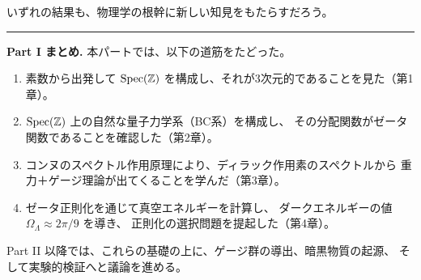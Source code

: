 いずれの結果も、物理学の根幹に新しい知見をもたらすだろう。

\vspace{2em}
\begin{center}
  \rule{0.4\textwidth}{0.4pt}
\end{center}
\vspace{1em}

\noindent\textbf{Part I まとめ.}
本パートでは、以下の道筋をたどった。

\begin{enumerate}
  \item 素数から出発して $\operatorname{Spec}(\mathbb{Z})$ を構成し、それが3次元的であることを見た（第1章）。
  \item $\operatorname{Spec}(\mathbb{Z})$ 上の自然な量子力学系（BC系）を構成し、
        その分配関数がゼータ関数であることを確認した（第2章）。
  \item コンヌのスペクトル作用原理により、ディラック作用素のスペクトルから
        重力＋ゲージ理論が出てくることを学んだ（第3章）。
  \item ゼータ正則化を通じて真空エネルギーを計算し、
        ダークエネルギーの値 $\Omega_\Lambda \approx 2\pi/9$ を導き、
        正則化の選択問題を提起した（第4章）。
\end{enumerate}

Part II 以降では、これらの基礎の上に、ゲージ群の導出、暗黒物質の起源、
そして実験的検証へと議論を進める。

